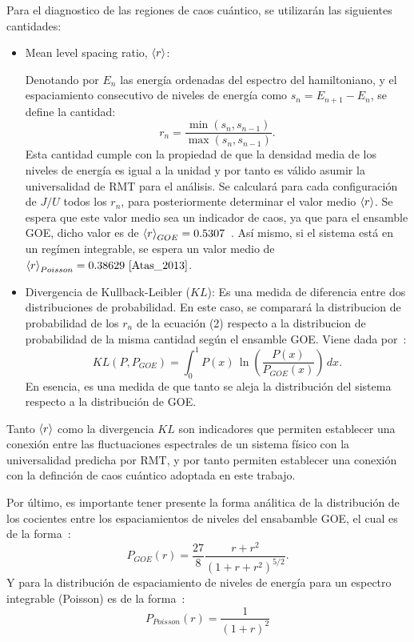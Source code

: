 \documentclass[spanish,titlepage,table]{practicas}
\begin{document}
Para el diagnostico de las regiones de caos cuántico, se utilizarán las siguientes cantidades:
\begin{itemize}
    \item Mean level spacing ratio, $\ev{r}$:

Denotando por $E_n$ las energía ordenadas del espectro del hamiltoniano, y el espaciamiento consecutivo de niveles de energía como 
    $s_n=E_{n+1}-E_{n}$, se define la cantidad:
		\begin{equation}
			r_n=\frac{\min(s_n,s_{n-1})}{\max(s_n,s_{n-1})}.
		\end{equation}
    Esta cantidad cumple con la propiedad de que la densidad media de los niveles de energía es igual a la unidad
    y por tanto es válido asumir la universalidad de RMT para el análisis.
    Se calculará para cada configuración de $J/U$ todos los $r_n$, para posteriormente determinar el valor medio $\ev{r}$.
    Se espera que este valor medio sea un indicador de caos, ya que para el ensamble GOE, dicho valor es de $\ev{r}_{GOE}=0.5307$~\cite{Atas_2013}. Así mismo, si el sistema está 
    en un regímen integrable, se espera un valor medio de $\ev{r}_{Poisson}=0.38629~\cite{Atas_2013}$.
    \item Divergencia de Kullback-Leibler ($KL$): Es una medida de diferencia entre dos distribuciones de probabilidad. En este caso, se comparará la distribucion de probabilidad de los $r_n$ de la ecuación (2)
    respecto a la distribucion de probabilidad de la misma cantidad según el ensamble GOE. Viene dada por~\cite{Pausch2022}:
    \begin{equation}
KL(P,P_{GOE}) = \int_{0}^{1} P(x) \, \ln \left( \frac{P(x)}{P_{GOE}(x)} \right) \, dx.
    \end{equation}
    En esencia, es una medida de que tanto se aleja la distribución del sistema respecto a la distribución de GOE.   
\end{itemize}
Tanto $\ev{r}$ como la divergencia $KL$ son indicadores que permiten establecer una conexión entre las fluctuaciones espectrales de un sistema físico 
con la universalidad predicha por RMT, y por tanto permiten establecer una conexión con la definción de caos cuántico adoptada en este trabajo.

Por último, es importante tener presente la forma análitica de la distribución de los cocientes entre los espaciamientos de niveles del ensabamble GOE, el cual es de la forma~\cite{Atas_2013}:
\begin{equation}
    P_{GOE}(r)=\frac{27}{8}\frac{r+r^{2}}{(1+r+r^{2})^{5/2}}.
\end{equation}
Y para la distribución de espaciamiento de niveles de energía para un espectro integrable (Poisson) es de la forma~\cite{Tekur2020}:
\begin{equation}
    P_{Poisson}(r)=\frac{1}{(1+r)^{2}}
\end{equation}
\end{document}
